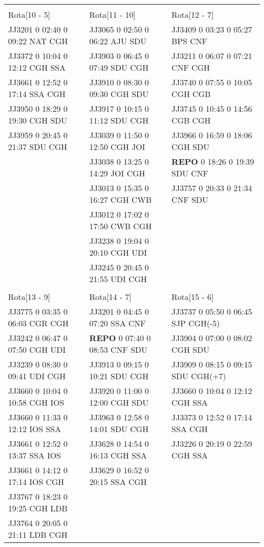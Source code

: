 \begin{scriptsize}
\begin{longtable}{l l l}
& & \\

Rota[10 - 5]  & Rota[11 - 10]  & Rota[12 - 7] \\
JJ3201 0 02:40 0 09:22 NAT CGH & JJ3065 0 02:50 0 06:22 AJU SDU & JJ3409 0 03:23 0 05:27 BPS CNF\\
JJ3372 0 10:04 0 12:12 CGH SSA & JJ3903 0 06:45 0 07:49 SDU CGH & JJ3211 0 06:07 0 07:21 CNF CGH\\
JJ3661 0 12:52 0 17:14 SSA CGH & JJ3910 0 08:30 0 09:30 CGH SDU & JJ3740 0 07:55 0 10:05 CGH CGB\\
JJ3950 0 18:29 0 19:30 CGH SDU & JJ3917 0 10:15 0 11:12 SDU CGH & JJ3745 0 10:45 0 14:56 CGB CGH\\
JJ3959 0 20:45 0 21:37 SDU CGH & JJ3039 0 11:50 0 12:50 CGH JOI & JJ3966 0 16:59 0 18:06 CGH SDU\\
 & JJ3038 0 13:25 0 14:29 JOI CGH & \textbf{REPO}   0 18:26 0 19:39 SDU CNF\\
 & JJ3013 0 15:35 0 16:27 CGH CWB & JJ3757 0 20:33 0 21:34 CNF SDU\\
 & JJ3012 0 17:02 0 17:50 CWB CGH & \\
 & JJ3238 0 19:04 0 20:10 CGH UDI & \\
 & JJ3245 0 20:45 0 21:55 UDI CGH & \\

& & \\

Rota[13 - 9]  & Rota[14 - 7]  & Rota[15 - 6] \\
JJ3775 0 03:35 0 06:03 CGR CGH & JJ3201 0 04:45 0 07:20 SSA CNF & JJ3737 0 05:50 0 06:45 SJP CGH(-5)\\
JJ3242 0 06:47 0 07:50 CGH UDI & \textbf{REPO}   0 07:40 0 08:53 CNF SDU & JJ3904 0 07:00 0 08:02 CGH SDU\\
JJ3239 0 08:30 0 09:41 UDI CGH & JJ3913 0 09:15 0 10:21 SDU CGH & JJ3909 0 08:15 0 09:15 SDU CGH(+7)\\
JJ3660 0 10:04 0 10:58 CGH IOS & JJ3920 0 11:00 0 12:00 CGH SDU & JJ3660 0 10:04 0 12:12 CGH SSA\\
JJ3660 0 11:33 0 12:12 IOS SSA & JJ3963 0 12:58 0 14:01 SDU CGH & JJ3373 0 12:52 0 17:14 SSA CGH\\
JJ3661 0 12:52 0 13:37 SSA IOS & JJ3628 0 14:54 0 16:13 CGH SSA & JJ3226 0 20:19 0 22:59 CGH SSA\\
JJ3661 0 14:12 0 17:14 IOS CGH & JJ3629 0 16:52 0 20:15 SSA CGH & \\
JJ3767 0 18:23 0 19:25 CGH LDB & & \\
JJ3764 0 20:05 0 21:11 LDB CGH & & \\


\end{longtable}
\end{scriptsize}
